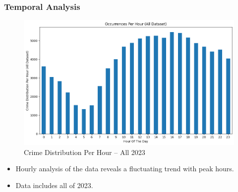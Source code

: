\documentclass{beamer}
\begin{document}
\begin{frame}
    \frametitle{Temporal Analysis}
    \begin{minipage}[c]{0.7\textwidth}
        \begin{figure}
            \centering
            \includegraphics[width=\linewidth]{Figures/Crime Distribution Per Hour (All Dataset).png}
            \caption{Crime Distribution Per Hour -- All 2023}
        \end{figure}
    \end{minipage}\hfill
    \begin{minipage}[c]{0.3\textwidth}
        {\scriptsize %
        \begin{itemize}
            \item Hourly analysis of the data reveals a fluctuating trend with peak hours.
            \item Data includes all of 2023.
        \end{itemize}
        }
    \end{minipage}

\end{frame}

\end{document}
